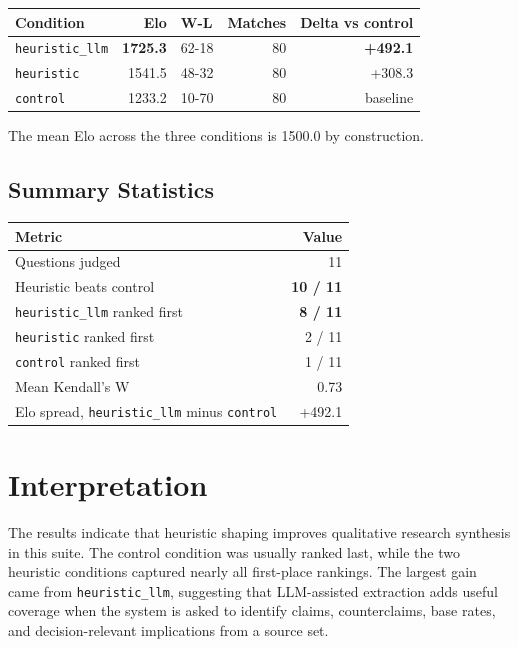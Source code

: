 \documentclass[11pt]{article}
\begin{document}
\begin{center}
\begin{tabular}{lrlrr}
\toprule
Condition & Elo & W-L & Matches & Delta vs control \\
\midrule
\texttt{heuristic\_llm} & \textbf{1725.3} & 62-18 & 80 & \textbf{+492.1} \\
\texttt{heuristic} & 1541.5 & 48-32 & 80 & +308.3 \\
\texttt{control} & 1233.2 & 10-70 & 80 & baseline \\
\bottomrule
\end{tabular}
\end{center}

The mean Elo across the three conditions is 1500.0 by construction.

\subsection{Summary Statistics}

\begin{center}
\begin{tabular}{lr}
\toprule
Metric & Value \\
\midrule
Questions judged & 11 \\
Heuristic beats control & \textbf{10 / 11} \\
\texttt{heuristic\_llm} ranked first & \textbf{8 / 11} \\
\texttt{heuristic} ranked first & 2 / 11 \\
\texttt{control} ranked first & 1 / 11 \\
Mean Kendall's W & 0.73 \\
Elo spread, \texttt{heuristic\_llm} minus \texttt{control} & +492.1 \\
\bottomrule
\end{tabular}
\end{center}

\section{Interpretation}

The results indicate that heuristic shaping improves qualitative research
synthesis in this suite. The control condition was usually ranked last, while
the two heuristic conditions captured nearly all first-place rankings. The
largest gain came from \texttt{heuristic\_llm}, suggesting that LLM-assisted
extraction adds useful coverage when the system is asked to identify claims,
counterclaims, base rates, and decision-relevant implications from a source set.
\end{document}
